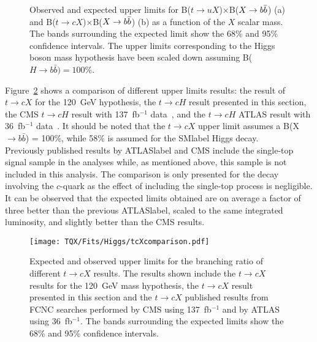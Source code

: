 \begin{figure}[htb]
    \RawFloats
    \centering
    \caption{Observed and expected upper limits for B($t\to uX$)$\times$B($X\to b\bar{b}$) (a) and B($t\to cX$)$\times$B($X\to b\bar{b}$) (b) as a function of the $X$ scalar mass. The bands surrounding the expected limit show the 68\% and 95\% confidence intervals. The upper limits corresponding to the Higgs boson mass hypothesis have been scaled down assuming B($H \rightarrow b \bar{b}) = 100\%$.}
    \label{tqX:limitIncH}
\end{figure}

Figure~\ref{tqX:cHlimitcomparison} shows a comparison of different upper limits results: the result of $t\to cX$ for the 120~GeV hypothesis, the $t\to cH$ result presented in this section, the CMS $t\to cH$ result with 137~fb$^{-1}$ data~\cite{CMStqHRun2}, and the $t\to cH$ ATLAS result with 36~fb$^{-1}$ data~\cite{TOPQ-2017-07}. It should be noted that the $t\to cX$ upper limit assumes a B(X$\rightarrow b \bar{b}$) = 100\%, while 58\% is assumed for the \acrshort{SMlabel} Higgs decay.\\

Previously published results by \acrshort{ATLASlabel} and CMS include the single-top signal sample in the analyses while, as mentioned above, this sample is not included in this analysis. The comparison is only presented for the decay involving the $c$-quark as the effect of including the single-top process is negligible. It can be observed that the expected limits obtained are on average a factor of three better than the previous \acrshort{ATLASlabel}, scaled to the same integrated luminosity, and slightly better than the CMS results.

\begin{figure}[htb]
    \RawFloats
    \centering
    \texttt{[image: TQX/Fits/Higgs/tcXcomparison.pdf]}
    \caption{Expected and observed upper limits for the branching ratio of different $t\to cX$ results. The results shown include the $t\to cX$ results for the 120~GeV mass hypothesis, the $t\to cX$ result presented in this section and the $t\to cX$ published results from FCNC searches performed by CMS using 137~fb$^{-1}$ and by ATLAS using 36~fb$^{-1}$. The bands surrounding the expected limits show the 68\% and 95\% confidence intervals.}
    \label{tqX:cHlimitcomparison}
\end{figure}


